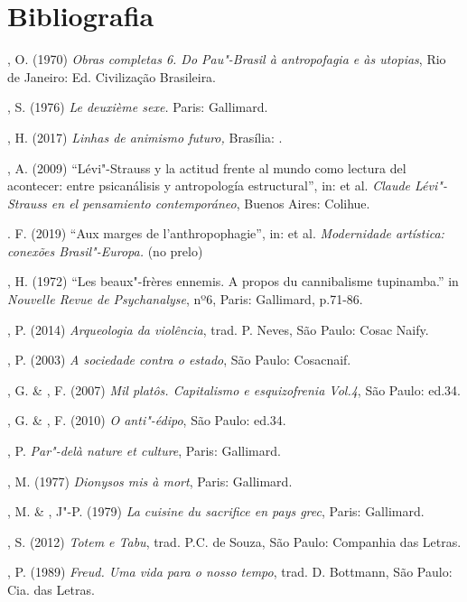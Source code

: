 \section{Bibliografia}

, O. (1970) \emph{Obras completas 6. Do Pau"-Brasil à antropofagia
e às utopias}, Rio de Janeiro: Ed. Civilização Brasileira.

, S. (1976) \emph{Le deuxième sexe.} Paris: Gallimard.

, H. (2017) \emph{Linhas de animismo futuro,} Brasília: .

, A. (2009) ``Lévi"-Strauss y la actitud frente al mundo como
lectura del acontecer: entre psicanálisis y antropología estructural'',
in:  et al. \emph{Claude Lévi"-Strauss en el pensamiento
contemporáneo}, Buenos Aires: Colihue.

. F. (2019) ``Aux marges de l'anthropophagie'', in:  et al.
\emph{Modernidade artística: conexões Brasil"-Europa.} (no prelo)

, H. (1972) ``Les beaux"-frères ennemis. A propos du cannibalisme
tupinamba.'' in \emph{Nouvelle Revue de Psychanalyse}, nº6, Paris:
Gallimard, p.71-86.

, P. (2014) \emph{Arqueologia da violência}, trad. P. Neves, São
Paulo: Cosac Naify.

, P. (2003) \emph{A sociedade contra o estado}, São Paulo:
Cosacnaif.

, G. \& , F. (2007) \emph{Mil platôs. Capitalismo e
esquizofrenia Vol.4}, São Paulo: ed.34.

, G. \& , F. (2010) \emph{O anti"-édipo}, São Paulo:
ed.34.

, P. \emph{Par"-delà nature et culture}, Paris: Gallimard.

, M. (1977) \emph{Dionysos mis à mort}, Paris: Gallimard.

, M. \& , J"-P. (1979) \emph{La cuisine du sacrifice en
pays grec}, Paris: Gallimard.

, S. (2012) \emph{Totem e Tabu}, trad. P.C. de Souza, São Paulo:
Companhia das Letras.

, P. (1989) \emph{Freud. Uma vida para o nosso tempo}, trad. D.
Bottmann, São Paulo: Cia. das Letras.

